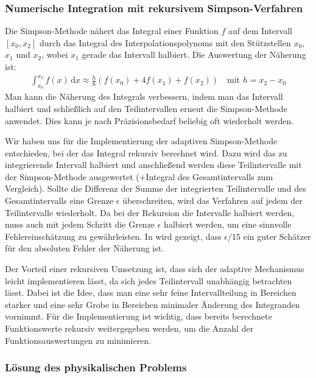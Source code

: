 \documentclass[10pt,a4paper]{article}
\begin{document}
\subsubsection{Numerische Integration mit rekursivem Simpson-Verfahren}
\label{sssec:integration}

Die Simpson-Methode nähert das Integral einer Funktion $f$ auf dem Intervall $[x_0,x_2]$ durch das Integral des Interpolationspolynoms mit den Stützstellen $x_0$, $x_1$ und $x_2$, wobei $x_1$ gerade das Intervall halbiert. Die Auswertung der Näherung ist:
\begin{align}
  \int_{x_0}^{x_2} f(x) \, \mathrm{d}x \approx \frac{h}{6} \left( f(x_0) + 4 f(x_1) + f(x_2) \right) \quad \text{mit } h = x_2 - x_0
\end{align}
Man kann die Näherung des Integrals verbessern, indem man das Intervall halbiert und schließlich auf den Teilintervallen erneut die Simpson-Methode anwendet. Dies kann je nach Präzisionsbedarf beliebig oft wiederholt werden.

Wir haben uns für die Implementierung der adaptiven Simpson-Methode entschieden, bei der das Integral rekursiv berechnet wird. Dazu wird das zu integrierende Intervall halbiert und anschließend werden diese Teilintervalle mit der Simpson-Methode ausgewertet (+Integral des Gesamtintervalls zum Vergleich). Sollte die Differenz der Summe der integrierten Teilintervalle und des Gesamtintervalls eine Grenze $\epsilon$ überschreiten, wird das Verfahren auf jedem der Teilintervalle wiederholt. Da bei der Rekursion die Intervalle halbiert werden, muss auch mit jedem Schritt die Grenze $\epsilon$ halbiert werden, um eine sinnvolle Fehlereinschätzung zu gewährleisten. In \cite{lyness} wird gezeigt, dass $\epsilon / 15$ ein guter Schätzer für den absoluten Fehler der Näherung ist.

Der Vorteil einer rekursiven Umsetzung ist, dass sich der adaptive Mechanismus leicht implementieren lässt, da sich jedes Teilintervall unabhängig betrachten lässt. Dabei ist die Idee, dass man eine sehr feine Intervallteilung in Bereichen starker und eine sehr Grobe in Bereichen minimaler Änderung des Integranden vornimmt. Für die Implementierung ist wichtig, dass bereits berechnete Funktionswerte rekursiv weitergegeben werden, um die Anzahl der Funktionsauswertungen zu minimieren.


\subsubsection{Lösung des physikalischen Problems}
\end{document}

